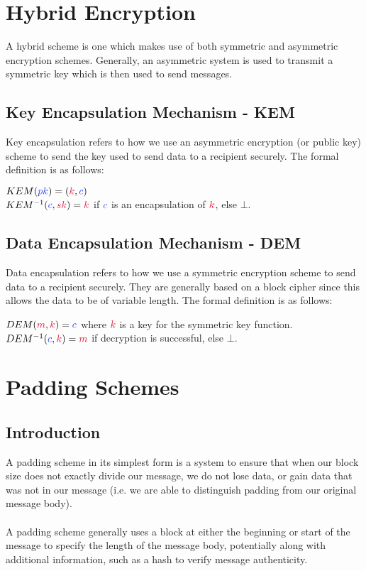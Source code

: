 \section{Hybrid Encryption}
	A hybrid scheme is one which makes use of both symmetric and asymmetric encryption schemes. Generally, an asymmetric system is used to transmit a symmetric key which is then used to send messages.\\

	\subsection{Key Encapsulation Mechanism - KEM}
		Key encapsulation refers to how we use an asymmetric encryption (or public key) scheme to send the key used to send data to a recipient securely. The formal definition is as follows:
		\begin{center}
			$KEM(\cpk) = (\cK,\cc)$\\
			$KEM^{-1}(\cc, \csk) = \cK$ \quad if $\cc$ is an encapsulation of $\cK$, else $\bot$.
		\end{center}

	\subsection{Data Encapsulation Mechanism - DEM}
		Data encapsulation refers to how we use a symmetric encryption scheme to send data to a recipient securely. They are generally based on a block cipher since this allows the data to be of variable length. The formal definition is as follows:
		\begin{center}
			$DEM(\cm,\cK) = \cc$ \quad where $\cK$ is a key for the symmetric key function.\\
			$DEM^{-1}(\cc,\ck) = \cm $ \quad if decryption is successful, else $\bot$.
		\end{center}


\section{Padding Schemes}

	\subsection{Introduction}
		A padding scheme in its simplest form is a system to ensure that when our block size does not exactly divide our message, we do not lose data, or gain data that was not in our message (i.e. we are able to distinguish padding from our original message body).\\
		\\
		A padding scheme generally uses a block at either the beginning or start of the message to specify the length of the message body, potentially along with additional information, such as a hash to verify message authenticity.

